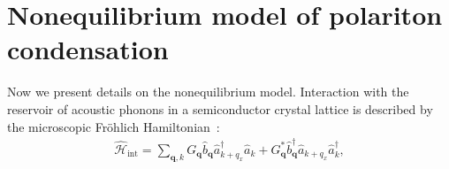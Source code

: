 



\section{Nonequilibrium model of polariton condensation}\label{AP:A4}
Now we present details on the nonequilibrium model.
Interaction with the reservoir of acoustic phonons in a semiconductor crystal lattice is described by the microscopic Fr\"ohlich Hamiltonian~\cite{Tassone:1997aa}:
%
\begin{eqnarray}
	\hat{\mathcal{H}}_\textrm{int}=\sum_{\mathbf{q},k}G_{\mathbf{q}}\hat{b}_{\mathbf{q}}\hat{a}^\dagger_{k+q_x}
	\hat{a}_k+G_{\mathbf{q}}^*\hat{b}^\dagger_{\mathbf{q}}\hat{a}_{k+q_x}\hat{a}^\dagger_k,
	\label{AP2_neq}
\end{eqnarray}

